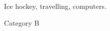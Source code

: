 



\begin{cvhonors}

  \cvhonor
    {} %
    {Ice hockey, travelling, computers.} %

\end{cvhonors}
\vspace{5pt}



\begin{cvhonors}

  \cvhonor
    {}%
    {Category B} %



\end{cvhonors}
\vspace{5pt}

